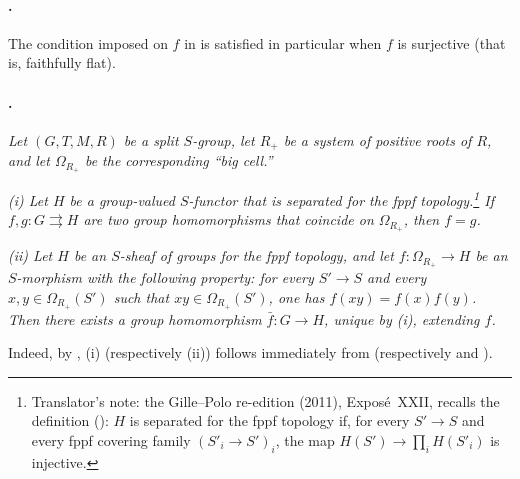 \paragraph{.}
The condition imposed on \(f\) in  is satisfied in particular
when \(f\) is surjective \textup{(that is, faithfully flat)}.

\paragraph{.}
\textit{Let \((G,T,M,R)\) be a split \(S\)-group, let \(R_+\) be a
system of positive roots of \(R\), and let \(\Omega_{R_+}\) be the
corresponding ``big cell.''}

\textit{\textup{(i)} Let \(H\) be a group-valued \(S\)-functor
that is separated
for the fppf topology.\footnote{Translator's note: the Gille--Polo re-edition (2011), Exposé~XXII, recalls
the definition (): \(H\) is separated for the fppf topology if,
for every \(S'\to S\) and every fppf covering family \((S'_i\to S')_i\), the
map \(H(S')\to\prod_iH(S'_i)\) is injective.} If
\(f,g:G\rightrightarrows H\) are two group homomorphisms that
coincide on \(\Omega_{R_+}\), then \(f=g\).}

\textit{\textup{(ii)} Let \(H\) be an \(S\)-sheaf of groups for the
fppf topology, and let \(f:\Omega_{R_+}\to H\) be an \(S\)-morphism
with the following property: for every \(S'\to S\) and every
\(x,y\in\Omega_{R_+}(S')\) such that
\(xy\in\Omega_{R_+}(S')\), one has
\(f(xy)=f(x)f(y)\). Then there exists a group homomorphism
\(\bar f:G\to H\), unique by \textup{(i)}, extending \(f\).}

Indeed, by , \textup{(i)} \textup{(respectively
\textup{(ii)})} follows immediately from 
\textup{(respectively  and )}.

